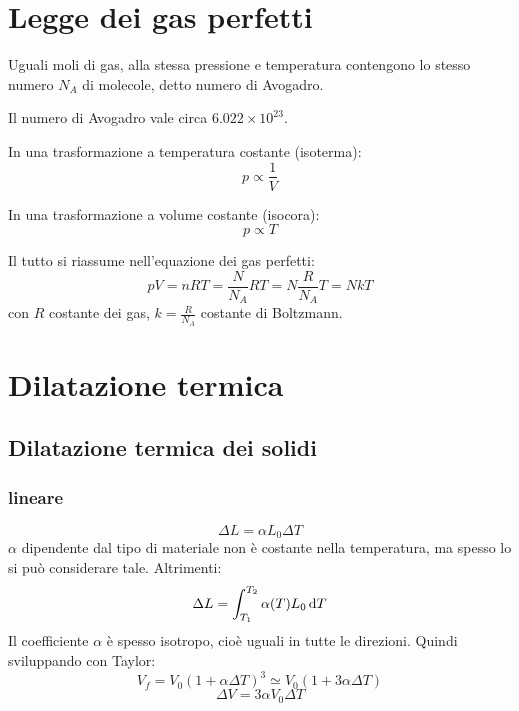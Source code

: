 \section{Legge dei gas perfetti}
\begin{legge}[Avogadro(1811)]
   Uguali moli di gas, alla stessa pressione e temperatura contengono lo stesso numero $N_A$ di molecole, detto numero di Avogadro.
\end{legge}
Il numero di Avogadro vale circa $6.022\times 10^{23}$.
\begin{legge}
   In una trasformazione a temperatura costante (isoterma):
   \begin{equation}
      p\propto\frac{1}{V}
   \end{equation}
\end{legge}
\begin{legge}
   In una trasformazione a volume costante (isocora):
   \begin{equation}
      p\propto{T}
   \end{equation}
\end{legge}
Il tutto si riassume nell'equazione dei gas perfetti:
\begin{equation}
   pV=nRT=\frac{N}{N_A}RT=N\frac{R}{N_A}T=NkT
\end{equation}
con $R$ costante dei gas, $k=\frac{R}{N_A}$ costante di Boltzmann.
\section{Dilatazione termica}
\subsection{Dilatazione termica dei solidi}
\subsubsection{lineare}
\begin{equation}
   \Delta L=\alpha L_0\Delta T
\end{equation}
$\alpha$ dipendente dal tipo di materiale non è costante nella temperatura, ma spesso lo si può considerare tale. Altrimenti:
\begin{equation}
   \Delta L=\int_{T_1}^{T_2} \alpha(T) L_0 \,\mathrm{d} T
\end{equation}
Il coefficiente $\alpha$ è spesso isotropo, cioè uguali in tutte le direzioni. Quindi sviluppando con Taylor:
\[
   V_f = V_0(1+\alpha\Delta T)^3 \simeq V_0(1+3\alpha\Delta T)
\]
\begin{equation}
   \Delta V=3\alpha V_0\Delta T
\end{equation}
